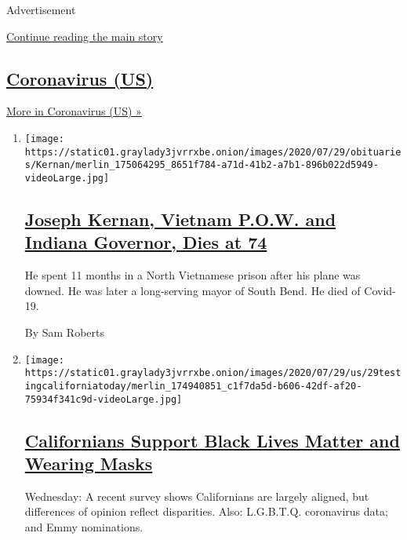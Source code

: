 Advertisement

\protect\hyperlink{after-mid1}{Continue reading the main story}

\hypertarget{coronavirus-us}{%
\subsection{\texorpdfstring{\href{/spotlight/coronavirus}{Coronavirus
(US)}}{Coronavirus (US)}}\label{coronavirus-us}}

\href{/spotlight/coronavirus}{More in Coronavirus (US) »}

\begin{enumerate}
\def\labelenumi{\arabic{enumi}.}
\item
  \texttt{[image: https://static01.graylady3jvrrxbe.onion/images/2020/07/29/obituaries/Kernan/merlin\_175064295\_8651f784-a71d-41b2-a7b1-896b022d5949-videoLarge.jpg]}

  \hypertarget{joseph-kernan-vietnam-pow-and-indiana-governor-dies-at-74}{%
  \subsection{\texorpdfstring{\href{/2020/07/29/us/politics/joseph-kernan-dead-coronavirus.html}{Joseph
  Kernan, Vietnam P.O.W. and Indiana Governor, Dies at
  74}}{Joseph Kernan, Vietnam P.O.W. and Indiana Governor, Dies at 74}}\label{joseph-kernan-vietnam-pow-and-indiana-governor-dies-at-74}}

  He spent 11 months in a North Vietnamese prison after his plane was
  downed. He was later a long-serving mayor of South Bend. He died of
  Covid-19.

  By Sam Roberts
\item
  \texttt{[image: https://static01.graylady3jvrrxbe.onion/images/2020/07/29/us/29testingcaliforniatoday/merlin\_174940851\_c1f7da5d-b606-42df-af20-75934f341c9d-videoLarge.jpg]}

  \hypertarget{californians-support-black-lives-matter-and-wearing-masks}{%
  \subsection{\texorpdfstring{\href{/2020/07/29/us/california-coronavirus-demographics.html}{Californians
  Support Black Lives Matter and Wearing
  Masks}}{Californians Support Black Lives Matter and Wearing Masks}}\label{californians-support-black-lives-matter-and-wearing-masks}}

  Wednesday: A recent survey shows Californians are largely aligned, but
  differences of opinion reflect disparities. Also: L.G.B.T.Q.
  coronavirus data; and Emmy nominations.


\end{enumerate}
